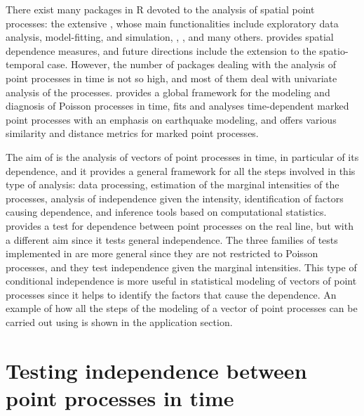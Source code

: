 There exist many  packages  in R devoted to the analysis of spatial  point processes: the extensive   \citep{Baddeley15},  whose main  functionalities include exploratory data analysis, model-fitting, and simulation,    \citep{stpp},  \citep{splancs}, and many others.  \citep{Giles19} provides spatial dependence measures, and future directions include  the  extension to the  spatio-temporal case. However, the  number of packages  dealing with the analysis of point processes in time  is not so high, and most of them deal with  univariate analysis of the processes.   \citep{Cebrian15}   provides a global framework for the  modeling and diagnosis of  Poisson processes in time,   \citep{PtProcess} fits and analyses time-dependent marked point processes with an emphasis on earthquake modeling, and  \citep{mmpp} offers various similarity and distance metrics for marked point processes.

 
 
The aim of   is the analysis of vectors of point processes in time, in particular of its dependence, and it  provides a general framework  for  all the steps involved in  this type of analysis:   data processing,  estimation of the marginal intensities of the processes,   analysis of  independence given the intensity, identification of factors causing  dependence, and inference  tools  based on computational statistics. 
  \citep{mppa} provides a test for dependence between point processes on the real line, but   with a different aim since it tests general independence. The three families of tests implemented in    are more general since they are not restricted to Poisson processes, and they  test independence given the  marginal intensities. This type  of  conditional independence is more useful in  statistical modeling of vectors of point processes since it helps to identify the factors  that cause the dependence. An example of how all the steps of the modeling  of  a vector of point processes can be carried out using  is shown in  the application section.

 


\section{Testing independence between point processes in time}

\label{Section4}

